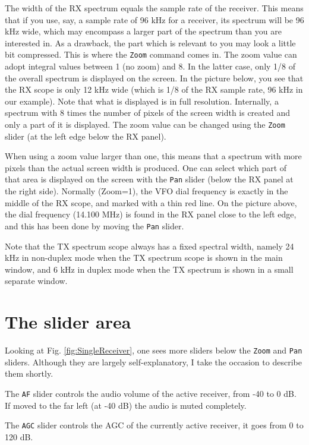 \documentclass[12pt]{book}
\def\rett#1{\texttt{\color{red}#1}}
\def\bltt#1{\texttt{\color{blue}#1}}
\begin{document}
The width of the RX spectrum equals the sample rate
of the receiver. This means that if you use, say,
a sample rate of 96 kHz for a receiver, its spectrum
will be 96 kHz wide, which may encompass a larger part
of the spectrum than you are interested in. As a drawback,
the part which is relevant to you may look a little bit
compressed. This is where the \bltt{Zoom} command
comes in. The zoom value can adopt integral values between
1 (no zoom) and 8. In the latter case, only 1/8 of the
overall spectrum is displayed on the screen. In the
picture below, you see that the RX scope is only 12 kHz
wide (which is 1/8 of the RX sample rate, 96 kHz in our
example). Note that what is displayed is in full resolution.
Internally, a spectrum with 8 times the number of pixels
of the screen width is created and only a part of it is
displayed. The zoom value can be changed using the \rett{Zoom}
slider (at the left edge below the RX panel).


When using a zoom value larger than one, this means that
a spectrum with more pixels than the actual screen width
is produced. One can select which part of that area
is displayed on the screen with the \rett{Pan} slider
(below the RX panel at the right side). Normally (Zoom=1),
the VFO dial frequency is exactly in the middle of the
RX scope, and marked with a thin red line. On the picture
above, the dial frequency (14.100 MHz) is found in the RX
panel close to the left edge, and this has been done
by moving the \rett{Pan} slider.

Note that the TX spectrum scope always has a fixed spectral
width, namely 24 kHz in non-duplex mode when the TX spectrum
scope is shown in the main window, and 6 kHz in duplex mode
when the TX spectrum is shown in a small separate window.

\section{The slider area}
\label{sec:SliderArea}
Looking at Fig. \ref{fig:SingleReceiver}, one sees more sliders below the \rett{Zoom} and \rett{Pan}
sliders. Although they are largely self-explanatory, I take the occasion to describe them shortly.

The \rett{AF} slider controls the audio volume of the active receiver, from -40 to 0 dB. If moved to the
far left (at -40 dB) the audio is muted completely.

The \rett{AGC} slider controls the AGC of the currently active receiver, it goes from 0 to 120 dB.
\end{document}
